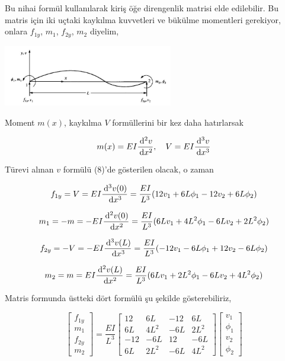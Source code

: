 \documentclass[12pt,fleqn]{article}\usepackage{../../common}
\begin{document}
Bu nihai formül kullanılarak kiriş öğe direngenlik matrisi elde
edilebilir. Bu matris için iki uçtaki kaykılma kuvvetleri ve
bükülme momentleri gerekiyor, onlara $f_{1y}$, $m_1$, $f_{2y}$,
$m_2$ diyelim,

\includegraphics[width=20em]{phy_020_strs_05_10.jpg}

Moment $m(x)$, kaykılma $V$ formüllerini bir kez daha hatırlarsak

$$
m(x) = EI \frac{\,\mathrm{d}^2 v}{\,\mathrm{d} x^2}, \quad
V = EI \frac{\,\mathrm{d}^3 v}{\,\mathrm{d} x^3}
$$

Türevi alınan $v$ formülü (8)'de gösterilen olacak, o zaman

$$
f_{1y} = V = EI \frac{\,\mathrm{d}^3 v(0)}{\,\mathrm{d} x^3} =
\frac{EI}{L^3} (12 v_1 + 6L \phi_1 - 12 v_2 + 6L \phi_2 )
$$

$$
m_1 = -m = -EI \frac{\,\mathrm{d}^2 v(0)}{\,\mathrm{d} x^2} =
\frac{EI}{L^3} ( 6L v_1 + 4L^2 \phi_1 - 6L v_2 + 2 L^2 \phi_2 )
$$

$$
f_{2y} = -V = -EI \frac{\,\mathrm{d}^3 v(L)}{\,\mathrm{d} x^3} =
\frac{EI}{L^3} (-12 v_1 - 6L \phi_1 + 12 v_2 - 6L \phi_2 )
$$

$$
m_2 = m = EI \frac{\,\mathrm{d}^2 v(L)}{\,\mathrm{d} x^2} =
\frac{EI}{L^3} ( 6L v_1 + 2L^2 \phi_1 - 6L v_2 + 4 L^2 \phi_2)
$$

Matris formunda üstteki dört formülü şu şekilde gösterebiliriz,

$$
\left[\begin{array}{c}
f_{1y} \\ m_1 \\ f_{2y} \\ m_2
\end{array}\right] =
\frac{EI}{L^3}
\left[\begin{array}{cccc}
12 & 6L & -12 & 6L \\
6L & 4L^2 & -6L & 2L^2 \\
-12 & -6L & 12 & -6L \\
6L & 2L^2 & -6L & 4L^2
\end{array}\right]
\left[\begin{array}{ccc}
v_1 \\ \phi_1 \\ v_2 \\ \phi_2
\end{array}\right]
$$
\end{document}
